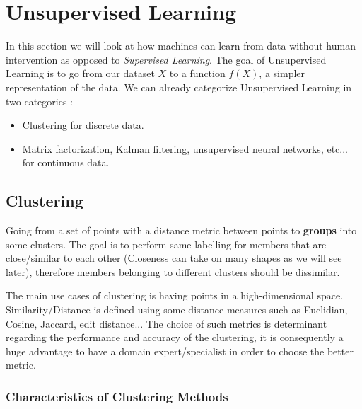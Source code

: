

\section{Unsupervised Learning}

In this section we will look at how machines can learn from data without human intervention as opposed to \emph{Supervised Learning}. The goal of Unsupervised Learning is to go from our dataset $X$ to a function $f(X)$, a simpler representation of the data. We can already categorize Unsupervised Learning in two categories :
\begin{itemize}
	\item Clustering for discrete data.
	\item Matrix factorization, Kalman filtering, unsupervised neural networks, etc... for continuous data.
\end{itemize}

\subsection{Clustering}

Going from a set of points with a distance metric between points to \textbf{groups} into some clusters. The goal is to perform same labelling for members that are close/similar to each other (Closeness can take on many shapes as we will see later), therefore members belonging to different clusters should be dissimilar. 

The main use cases of clustering is having points in a high-dimensional space. Similarity/Distance is defined using some distance measures such as Euclidian, Cosine, Jaccard, edit distance... The choice of such metrics is determinant regarding the performance and accuracy of the clustering, it is consequently a huge advantage to have a domain expert/specialist in order to choose the better metric.

\subsubsection{Characteristics of Clustering Methods}

